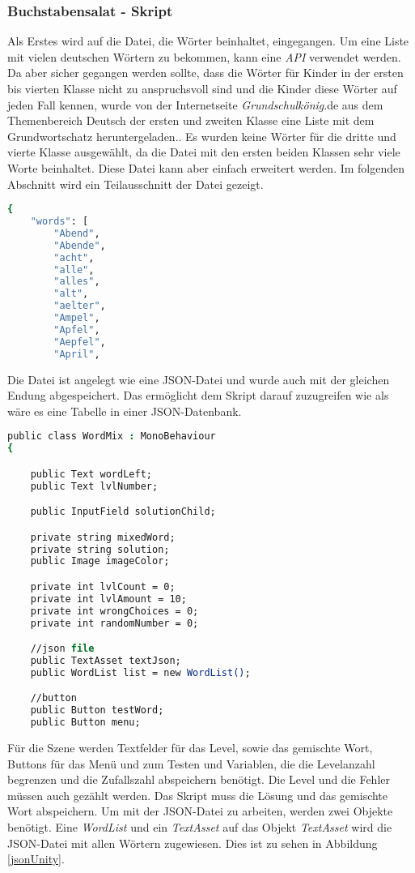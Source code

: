 \subsubsection{Buchstabensalat - Skript}
Als Erstes wird auf die Datei, die Wörter beinhaltet, eingegangen. Um eine Liste mit vielen deutschen Wörtern zu bekommen, kann eine \textit{API} verwendet werden. Da aber sicher gegangen werden sollte, dass die Wörter für Kinder in der ersten bis vierten Klasse nicht zu anspruchsvoll sind und die Kinder diese Wörter auf jeden Fall kennen, wurde von der Internetseite \textit{Grundschulkönig}.de aus dem Themenbereich Deutsch der ersten und zweiten Klasse eine Liste mit dem Grundwortschatz heruntergeladen.\autocite{Grundschulkönig}. Es wurden keine Wörter für die dritte und vierte Klasse ausgewählt, da die Datei mit den ersten beiden Klassen sehr viele Worte beinhaltet. Diese Datei kann aber einfach erweitert werden. Im folgenden Abschnitt wird ein Teilausschnitt der Datei gezeigt. 
\begin{lstlisting}[language=csh, caption={Wortdatei}]
{
	"words": [
		"Abend",
		"Abende",
		"acht",
		"alle",
		"alles",
		"alt",
		"aelter",
		"Ampel",
		"Apfel",
		"Aepfel",
		"April",
\end{lstlisting}
Die Datei ist angelegt wie eine JSON-Datei und wurde auch mit der gleichen Endung abgespeichert. Das ermöglicht dem Skript darauf zuzugreifen wie als wäre es eine Tabelle in einer JSON-Datenbank.\\
\begin{lstlisting}[language=csh, caption={WordMix.cs Variablendeklaration}]
public class WordMix : MonoBehaviour
{

	public Text wordLeft;
	public Text lvlNumber;

	public InputField solutionChild;

	private string mixedWord;
	private string solution;
	public Image imageColor;

	private int lvlCount = 0;
	private int lvlAmount = 10;
	private int wrongChoices = 0;
	private int randomNumber = 0;

	//json file
	public TextAsset textJson;
	public WordList list = new WordList();

	//button
	public Button testWord;
	public Button menu;
\end{lstlisting}
Für die Szene werden Textfelder für das Level, sowie das gemischte Wort, Buttons für das Menü und zum Testen und Variablen, die die Levelanzahl begrenzen und die Zufallszahl abspeichern benötigt. Die Level und die Fehler müssen auch gezählt werden. Das Skript muss die Lösung und das gemischte Wort abspeichern. Um mit der JSON-Datei zu arbeiten, werden zwei Objekte benötigt. Eine \textit{WordList} und ein \textit{TextAsset} auf das Objekt \textit{TextAsset} wird die JSON-Datei mit allen Wörtern zugewiesen. Dies ist zu sehen in Abbildung \ref{jsonUnity}. 
